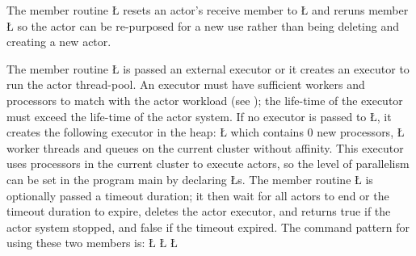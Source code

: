 \documentclass[openright,twoside]{report}
\begin{document}
The member routine \LGinlinetrue\LGbegin\lgrinde\L{}\endlgrinde\LGend{} resets an actor's receive member to \LGinlinetrue\LGbegin\lgrinde\L{}\endlgrinde\LGend{} and reruns member \LGinlinetrue\LGbegin\lgrinde\L{}\endlgrinde\LGend{} so the actor can be re-purposed for a new use rather than being deleting and creating a new actor.

The member routine \LGinlinetrue\LGbegin\lgrinde\L{}\endlgrinde\LGend{} is passed an external executor or it creates an executor to run the actor thread-pool.
An executor must have sufficient workers and processors to match with the actor workload (see );
the life-time of the executor must exceed the life-time of the actor system.
If no executor is passed to \LGinlinetrue\LGbegin\lgrinde\L{}\endlgrinde\LGend{}, it creates the following executor in the heap:
\LGinlinefalse\LGbegin\lgrinde
\L{}
\endlgrinde\LGend
which contains 0 new processors, \LGinlinetrue\LGbegin\lgrinde\L{}\endlgrinde\LGend{} worker threads and queues on the current cluster without affinity.
This executor uses processors in the current cluster to execute actors, so the level of parallelism can be set in the program main by declaring \LGinlinetrue\LGbegin\lgrinde\L{}\endlgrinde\LGend{}s.
The member routine \LGinlinetrue\LGbegin\lgrinde\L{}\endlgrinde\LGend{} is optionally passed a timeout duration;
it then wait for all actors to end or the timeout duration to expire, deletes the actor executor, and returns true if the actor system stopped, and false if the timeout expired.
The command pattern for using these two members is:
\LGinlinefalse\LGbegin\lgrinde
\L{}
\CE{}\L{}
\CE{}\L{}
\CE{}\endlgrinde\LGend
\end{document}
